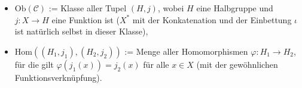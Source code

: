 \begin{solution}
\begin{enumerate}[label = \arabic*)]
\begin{itemize}
    \item $\mathrm{Ob}(\mathcal{C})$ := Klasse aller Tupel $(H, j)$, wobei $H$ eine Halbgruppe und $j: X \rightarrow H$ eine Funktion ist ($X^*$ mit der Konkatenation und der Einbettung $\iota$ ist natürlich selbst in dieser Klasse),
    \item $\mathrm{Hom}((H_1, j_1), (H_2, j_2))$ := Menge aller Homomorphismen $\varphi: H_1 \rightarrow H_2$, für die gilt $\varphi(j_1 (x)) = j_2 (x)$ für alle $x \in X$ (mit der gewöhnlichen Funktionsverknüpfung).
    \end{itemize}
    \begin{center}
    \end{center}
    \end{enumerate}
\end{solution}
